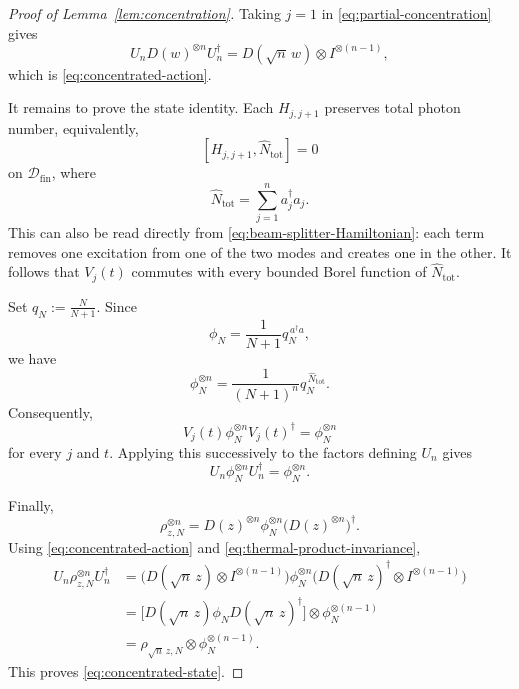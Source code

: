 \documentclass{article}
\theoremstyle{named}
\theoremstyle{named1}
\theoremstyle{plain}
\theoremstyle{remark}
\begin{document}
\begin{proof}[Proof of Lemma~\ref{lem:concentration}]
Taking $j=1$ in \eqref{eq:partial-concentration} gives
\begin{equation}
    U_nD(w)^{\otimes n}U_n^\dagger
    =
    D(\sqrt n\,w)\otimes I^{\otimes(n-1)},
    \label{eq:appendix-concentrated-action}
\end{equation}
which is \eqref{eq:concentrated-action}.

It remains to prove the state identity.  Each $H_{j,j+1}$ preserves total
photon number, equivalently,
\[
    [H_{j,j+1},\widehat N_{\mathrm{tot}}]=0
\]
on $\mathscr D_{\mathrm{fin}}$, where 
\[\widehat N_{\mathrm{tot}} =\sum_{j=1}^n a_j^\dagger a_j.\]
This can also be read directly from
\eqref{eq:beam-splitter-Hamiltonian}: each term removes one excitation
from one of the two modes and creates one in the other.
It follows that
$V_j(t)$ commutes with every bounded Borel function of
$\widehat N_{\mathrm{tot}}$.

Set
$
    q_N:=\frac{N}{N+1}.
$
Since
\[
    \phi_N
    =
    \frac{1}{N+1}
    q_N^{\,a^\dagger a},
\]
we have
\begin{equation}
    \phi_N^{\otimes n}
    =
    \frac{1}{(N+1)^n}
    q_N^{\,\widehat N_{\mathrm{tot}}}.
    \label{eq:thermal-product-number-form}
\end{equation}
Consequently,
\[
    V_j(t)\phi_N^{\otimes n}V_j(t)^\dagger
    =
    \phi_N^{\otimes n}
\]
for every $j$ and $t$.  Applying this successively to the factors defining
$U_n$ gives
\begin{equation}
    U_n\phi_N^{\otimes n}U_n^\dagger
    =
    \phi_N^{\otimes n}.
    \label{eq:thermal-product-invariance}
\end{equation}

Finally,
\[
    \rho_{z,N}^{\otimes n}
    =
    D(z)^{\otimes n}
    \phi_N^{\otimes n}
    \bigl(D(z)^{\otimes n}\bigr)^\dagger.
\]
Using \eqref{eq:concentrated-action} and
\eqref{eq:thermal-product-invariance},
\begin{align*}
    U_n\rho_{z,N}^{\otimes n}U_n^\dagger
    &=
    \bigl(
        D(\sqrt n\,z)\otimes I^{\otimes(n-1)}
    \bigr)
    \phi_N^{\otimes n}
    \bigl(
        D(\sqrt n\,z)^\dagger\otimes I^{\otimes(n-1)}
    \bigr)
\\
    &=
    \bigl[
        D(\sqrt n\,z)
        \phi_N
        D(\sqrt n\,z)^\dagger
    \bigr]
    \otimes
    \phi_N^{\otimes(n-1)}
\\
    &=
    \rho_{\sqrt n\,z,N}
    \otimes
    \phi_N^{\otimes(n-1)}.
\end{align*}
This proves \eqref{eq:concentrated-state}.
\end{proof}
\end{document}
